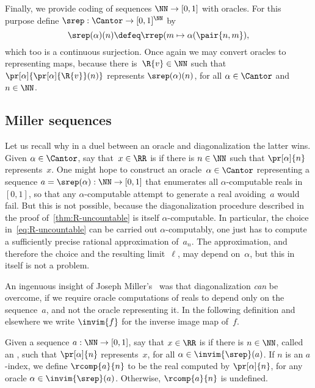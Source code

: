 Finally, we provide coding of sequences $\NN \to [0,1]$ with oracles. For this purpose define $\srep : \Cantor \to [0,1]^\NN$ by
%
\begin{equation*}
  \srep(\alpha)(n) \defeq \rrep(m \mapsto \alpha(\pair{n,m}),
\end{equation*}
%
which too is a continuous surjection.
Once again we may convert oracles to representing maps, because there is~$\R{v} \in \NN$ such that $\pr[\alpha]{\pr[\alpha]{\R{v}}(n)}$ represents $\srep(\alpha)(n)$, for all $\alpha \in \Cantor$ and $n \in \NN$.


\subsection{Miller sequences}
\label{sec:miller-sequences}

Let us recall why in a duel between an oracle and diagonalization the latter wins.
%
Given $\alpha \in \Cantor$, say that~$x \in \RR$ is  if there is $n \in \NN$ such that $\pr[\alpha]{n}$ represents~$x$.
%
One might hope to construct an oracle~$\alpha \in \Cantor$ representing a sequence $a = \srep(\alpha) : \NN \to [0,1]$ that enumerates all $\alpha$-computable reals in~$[0,1]$, so that any $\alpha$-computable attempt to generate a real avoiding~$a$ would fail.
%
But this is not possible, because the diagonalization procedure described in the proof of~\cref{thm:R-uncountable} is itself $\alpha$-computable.
%
In particular, the choice in~\eqref{eq:R-uncountable} can be carried out $\alpha$-computably, one just has to compute a sufficiently precise rational approximation of~$a_n$.
%
The approximation, and therefore the choice and the resulting limit~$\ell$, may depend on~$\alpha$, but this in itself is not a problem.

An ingenuous insight of Joseph Miller's~\cite{miller04:_cont_deg} was that diagonalization \emph{can} be overcome, if we require oracle computations of reals to depend only on the sequence~$a$, and not the oracle representing it. In the following definition and elsewhere we write $\invim{f}$ for the inverse image map of~$f$.

\begin{definition}
  \label{def:sequence-computable}
  Given a sequence $a : \NN \to [0,1]$, say that $x \in \RR$ is  if there is $n \in \NN$, called an , such that $\pr[\alpha]{n}$ represents~$x$, for all $\alpha \in \invim{\srep}(a)$.
  If $n$ is an $a$-index, we define $\rcomp{a}{n}$ to be the real computed by $\pr[\alpha]{n}$, for any oracle $\alpha \in \invim{\srep}(a)$. Otherwise, $\rcomp{a}{n}$ is undefined.
\end{definition}

